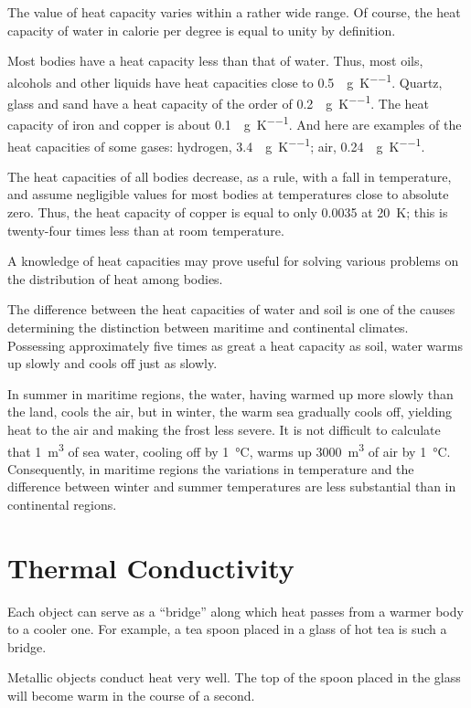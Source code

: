 The value of heat capacity varies within a rather wide range. Of course, the heat capacity of water in calorie per degree is equal to unity by definition.

Most bodies have a heat capacity less than that of water. Thus, most oils, alcohols and other liquids have heat capacities close to \SI{0.5}{\calorie\per\gram\per\kelvin}. Quartz, glass and sand have a heat capacity of the order of \SI{0.2}{\calorie\per\gram\per\kelvin}. The heat capacity of iron and copper is about \SI{0.1}{\calorie\per\gram\per\kelvin}. And here are examples of the heat capacities of some gases: hydrogen, \SI{3.4}{\calorie\per\gram\per\kelvin}; air, \SI{0.24}{\calorie\per\gram\per\kelvin}.

The heat capacities of all bodies decrease, as a rule, with a fall in temperature, and assume negligible values for most bodies at temperatures close to absolute zero. Thus, the heat capacity of copper is equal to only 0.0035 at \SI{20}{\kelvin}; this is twenty-four times less than at room tem­perature.

A knowledge of heat capacities may prove useful for solving various problems on the distribution of heat among bodies.

The difference between the heat capacities of water and soil is one of the causes determining the distinction between maritime and continental climates. Possessing approximately five times as great a heat capacity as soil, water warms up slowly and cools off just as slowly.

In summer in maritime regions, the water, having warmed up more slowly than the land, cools the air, but in winter, the warm sea gradually cools off, yielding heat to the air and making the frost less severe. It is not diffi­cult to calculate that \SI{1}{\meter\cubed} of sea water, cooling off by \SI{1}{\celsius}, warms up \SI{3000}{\meter\cubed} of air by \SI{1}{\celsius}. Consequently, in maritime regions the variations in temperature and the difference between winter and summer temperatures are less substantial than in continental regions.

\section{Thermal Conductivity}
Each object can serve as a ``bridge'' along which heat passes from a warmer body to a cooler one. For example, a tea spoon placed in a glass of hot tea is such a bridge.

Metallic objects conduct heat very well. The top of the spoon placed in the glass will become warm in the course of a second.

